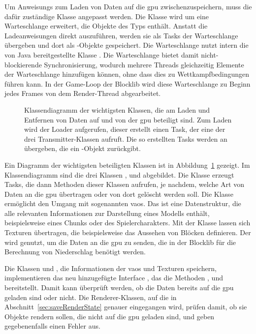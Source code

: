 Um \glspl{Anweisung} zum Laden von Daten auf die \ac{gpu} zwischenzuspeichern, muss die dafür zuständige Klasse \classLoader{} angepasst werden. Die Klasse wird um eine Warteschlange erweitert, die Objekte des Typs \classRunnable{} enthält. Anstatt die Ladeanweisungen direkt auszuführen, werden sie als Tasks der Warteschlange übergeben und dort als \classRunnable{}-Objekte gespeichert. Die Warteschlange nutzt intern die von Java bereitgestellte Klasse \classConcurrentLinkedQueue{}. Die Warteschlange bietet damit nicht-blockierende Synchronisierung, wodurch mehrere Threads gleichzeitig Elemente der Warteschlange hinzufügen können, ohne dass dies zu Wettkampfbedingungen führen kann. In der Game-Loop der Blocklib wird diese Warteschlange zu Beginn jedes Frames von dem Render-Thread abgearbeitet.

\begin{figure}
	\centering
	
	\caption[Klassendiagramm der wichtigsten Klassen, die am Laden und Entfernen von Daten auf und von der  beteiligt sind.]{Klassendiagramm der wichtigsten Klassen, die am Laden und Entfernen von Daten auf und von der \ac{gpu} beteiligt sind. Zum Laden wird der Loader aufgerufen, dieser erstellt einen Task, der eine der drei Transmitter-Klassen aufruft. Die so erstellten Tasks werden an \classDoubleBufferedAsyncQueue{} übergeben, die ein \classCompletableFuture{}-Objekt zurückgibt.}\label{fig:loaderDiagram}
\end{figure}
Ein Diagramm der wichtigsten beteiligten Klassen ist in Abbildung~\ref{fig:loaderDiagram} gezeigt. Im Klassendiagramm sind die drei Klassen \classVAOTransmitter{}, \classTextureTransmitter{} und \classDataTransmitter{} abgebildet. Die Klasse \classLoader{} erzeugt Tasks, die dann Methoden dieser Klassen aufrufen, je nachdem, welche Art von Daten an die \ac{gpu} übertragen oder von dort gelöscht werden soll. Die Klasse \classVAOTransmitter{} ermöglicht den Umgang mit sogenannten \acp{vao}. Das ist eine Datenstruktur, die alle relevanten Informationen zur Darstellung eines Modells enthält, beispielsweise eines Chunks oder des Spielercharakters. Mit der Klasse \classTextureTransmitter{} lassen sich Texturen übertragen, die beispielsweise das Aussehen von Blöcken definieren. Der \classDataTransmitter{} wird genutzt, um die Daten an die \ac{gpu} zu senden, die in der Blocklib für die Berechnung von Niederschlag benötigt werden.

Die Klassen \classRawModel{} und \classModelTexture{}, die Informationen der \acp{vao} und Texturen speichern, implementieren das neu hinzugefügte Interface \classAsyncGraphicsObject{}, das die Methoden 	, 
 und 
 bereitstellt. Damit kann überprüft werden, ob die Daten bereits auf die \ac{gpu} geladen sind oder nicht. Die Renderer-Klassen, auf die in Abschnitt~\ref{sec:saveRenderState} genauer eingegangen wird, prüfen damit, ob sie Objekte rendern sollen, die nicht auf die \ac{gpu} geladen sind, und geben gegebenenfalls einen Fehler aus.

